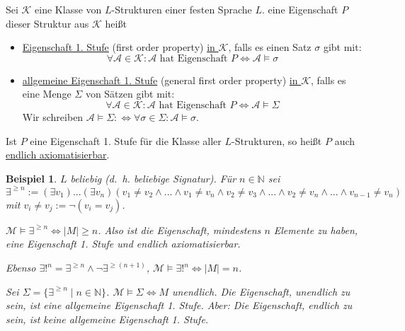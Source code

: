 \documentclass{article}
\theoremstyle{definition}
\theoremstyle{plain}
\newtheorem*{bsp}{Beispiel}
\newcommand{\m}[1]{\mathcal{#1}}
\begin{document}
    Sei $ \m{K} $ eine Klasse von $ L $-Strukturen einer festen Sprache $ L $.
    eine Eigenschaft $ P$ dieser Struktur aus $ \m{K} $ heißt
    \begin{itemize}
        \item \underline{Eigenschaft 1. Stufe} (first order property) \underline{in $ \m{K} $}, falls es einen Satz $ \sigma $ gibt mit:
        \begin{equation*}
            \forall \m{A} \in \m{K} : \m{A} \text{ hat Eigenschaft } P \Leftrightarrow \m{A} \models \sigma
        \end{equation*}
        \item \underline{allgemeine Eigenschaft 1. Stufe} (general first order property) \underline{in $ \m{K} $}, falls es eine Menge $ \Sigma $ von Sätzen gibt mit:
        \begin{equation*}
            \forall \m{A} \in \m{K} : \m{A} \text{ hat Eigenschaft } P \Leftrightarrow \m{A} \models \Sigma
        \end{equation*}
        Wir schreiben $ \m{A} \models \Sigma :\Leftrightarrow \forall \sigma \in \Sigma: \m{A} \models \sigma $.
    \end{itemize}
    Ist $ P $ eine Eigenschaft 1. Stufe für die Klasse aller $ L $-Strukturen, so heißt $ P $ auch \underline{endlich axiomatisierbar}.

    \begin{bsp}
        $ L $ beliebig (d.~h. beliebige Signatur).
        Für $ n \in \mathbb{N} $ sei
        \begin{equation*}
            \exists^{\geq n} := (\exists v_1) ... (\exists v_n) (v_1 \not = v_2 \land ... \land v_1 \not = v_n \land v_2 \not = v_3 \land ... \land v_2 \not = v_n \land ... \land v_{n-1} \not = v_n)
        \end{equation*}
        mit $ v_i \not = v_j := \neg (v_i = v_j) $.

        $ \m{M} \models \exists^{\geq n} \Leftrightarrow | M | \geq n $.
        Also ist die Eigenschaft, mindestens $ n $ Elemente zu haben, eine Eigenschaft 1. Stufe und endlich axiomatisierbar.

        Ebenso $ \exists!^n = \exists^{\geq n} \land \neg \exists^{\geq(n+1)} $, $ \m{M} \models \exists!^n \Leftrightarrow |M| = n $.

        Sei $ \Sigma = \{ \exists^{\geq n} \mid n \in \mathbb{N} \} $.
        $ \m{M} \models \Sigma \Leftrightarrow M $ unendlich.
        Die Eigenschaft, unendlich zu sein, ist eine allgemeine Eigenschaft 1. Stufe.
        Aber: Die Eigenschaft, endlich zu sein, ist keine allgemeine Eigenschaft 1. Stufe.
    \end{bsp}
\end{document}

